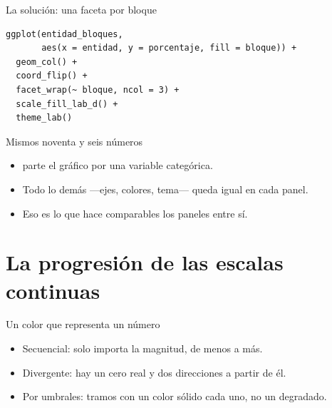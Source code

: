 \begin{frame}[fragile]{La solución: una faceta por bloque}
\begin{lstlisting}
ggplot(entidad_bloques,
       aes(x = entidad, y = porcentaje, fill = bloque)) +
  geom_col() +
  coord_flip() +
  facet_wrap(~ bloque, ncol = 3) +
  scale_fill_lab_d() +
  theme_lab()
\end{lstlisting}

  \vspace{0.7em}
\end{frame}

\begin{frame}{Mismos noventa y seis números}
  \vspace{0.3em}
  \begin{itemize}\setlength{\itemsep}{0.9em}
    \item<1->  parte el gráfico por una variable
          categórica.
    \item<2-> Todo lo demás —ejes, colores, tema— queda igual en cada
          panel.
    \item<3-> Eso es lo que hace comparables los paneles entre sí.
  \end{itemize}

  \vspace{1.1em}
\end{frame}

\section{La progresión de las escalas continuas}

\begin{frame}{Un color que representa un número}
  \vspace{0.3em}
  \begin{itemize}\setlength{\itemsep}{0.9em}
    \item<1-> \ac{Secuencial}: solo importa la magnitud, de menos a más.
    \item<2-> \ac{Divergente}: hay un cero real y dos direcciones a
          partir de él.
    \item<3-> \ac{Por umbrales}: tramos con un color sólido cada uno, no
          un degradado.
  \end{itemize}

  \vspace{1.1em}
\end{frame}

